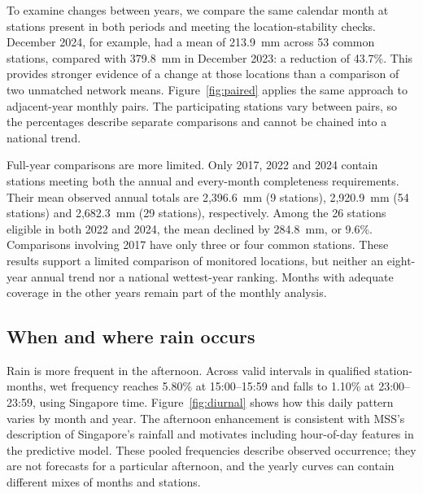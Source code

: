 To examine changes between years, we compare the same calendar month at stations present in both periods and meeting the location-stability checks. December 2024, for example, had a mean of 213.9~mm across 53 common stations, compared with 379.8~mm in December 2023: a reduction of 43.7\%. This provides stronger evidence of a change at those locations than a comparison of two unmatched network means. Figure~\ref{fig:paired} applies the same approach to adjacent-year monthly pairs. The participating stations vary between pairs, so the percentages describe separate comparisons and cannot be chained into a national trend.


Full-year comparisons are more limited. Only 2017, 2022 and 2024 contain stations meeting both the annual and every-month completeness requirements. Their mean observed annual totals are 2,396.6~mm (9 stations), 2,920.9~mm (54 stations) and 2,682.3~mm (29 stations), respectively. Among the 26 stations eligible in both 2022 and 2024, the mean declined by 284.8~mm, or 9.6\%. Comparisons involving 2017 have only three or four common stations. These results support a limited comparison of monitored locations, but neither an eight-year annual trend nor a national wettest-year ranking. Months with adequate coverage in the other years remain part of the monthly analysis.

\subsection{When and where rain occurs}

Rain is more frequent in the afternoon. Across valid intervals in qualified station-months, wet frequency reaches 5.80\% at 15:00--15:59 and falls to 1.10\% at 23:00--23:59, using Singapore time. Figure~\ref{fig:diurnal} shows how this daily pattern varies by month and year. The afternoon enhancement is consistent with MSS's description of Singapore's rainfall \cite{climate} and motivates including hour-of-day features in the predictive model. These pooled frequencies describe observed occurrence; they are not forecasts for a particular afternoon, and the yearly curves can contain different mixes of months and stations.

